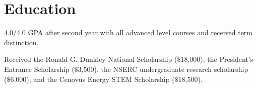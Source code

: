 \section{Education}

\begin{resumeItem}
\begin{resumeList}
    \item 4.0/4.0 GPA after second year with all advanced level courses and received term distinction.
    \item Received the Ronald G. Dunkley National Scholarship (\$18,000), the President's Entrance Scholarship (\$3,500), the NSERC undergraduate research scholarship (\$6,000), and the Cenovus Energy STEM Scholarship (\$18,500).
\end{resumeList}
\end{resumeItem}


